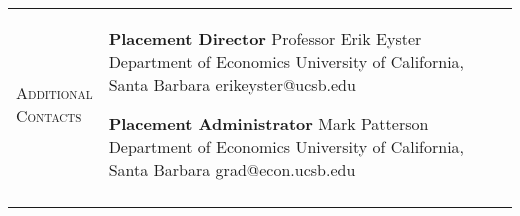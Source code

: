 \documentclass[11pt]{article}
\begin{document}
\begin{tabularx}{\textwidth}{@{}Y Z@{}}
	\textsc{Additional \newline Contacts}  & 
	\begin{minipage}[t]{0.41\textwidth}
		\textbf{Placement Director} \newline
		Professor Erik Eyster \newline
		Department of Economics \newline
		University of California, Santa Barbara \newline
		erikeyster@ucsb.edu
	\end{minipage}\begin{minipage}[t]{0.5\textwidth}
		\textbf{Placement Administrator} \newline
		Mark Patterson \newline
		Department of Economics \newline
		University of California, Santa Barbara \newline
		grad@econ.ucsb.edu
	\end{minipage}
	\newline  \\ \addlinespace[20pt] 
	

\end{tabularx}
\end{document}
